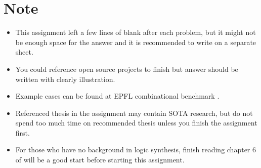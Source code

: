 \documentclass[main.tex]{subfiles}
\begin{document}
\thispagestyle{empty}
\section*{Note}
\begin{itemize}
    \item This assignment left a few lines of blank after each problem, but it might not be enough space for the answer and it is recommended to write on a separate sheet.
    \item You could reference open source projects to finish but answer should be written with clearly illustration.
    \item Example cases can be found at EPFL combinational benchmark \cite{EPFLCombBenchmark}.
    \item Referenced thesis in the assignment may contain SOTA research, but do not spend too much time on recommended thesis unless you finish the assignment first.
    \item For those who have no background in logic synthesis, finish reading chapter 6 of \cite{EDA2009} will be a good start before starting this assignment.
\end{itemize}
\end{document}
